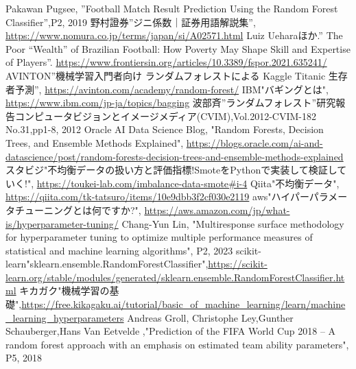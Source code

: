 \documentclass[platex]{suribt}
\begin{document}
\begin{thebibliography}{2}
\bibitem{}
Pakawan Pugsee, ”Football Match Result Prediction Using the Random Forest Classifier”,P2, 2019
\bibitem{}
野村證券”ジニ係数｜証券用語解説集”, \url{https://www.nomura.co.jp/terms/japan/si/A02571.html}
\bibitem{}
Luiz Ueharaほか.” The Poor “Wealth” of Brazilian Football: How Poverty May Shape Skill and Expertise of Players”. \url{https://www.frontiersin.org/articles/10.3389/fspor.2021.635241/}
\bibitem{}
AVINTON”機械学習入門者向け ランダムフォレストによる Kaggle Titanic 生存者予測”, \url{https://avinton.com/academy/random-forest/}
\bibitem{}
IBM"バギングとは", \url{https://www.ibm.com/jp-ja/topics/bagging}
\bibitem{}
波部斉”ランダムフォレスト”研究報告コンピュータビジョンとイメージメディア(CVIM),Vol.2012-CVIM-182 No.31,pp1-8, 2012
\bibitem{}
Oracle AI Data Science Blog, "Random Forests, Decision Trees, and Ensemble Methods Explained",  \url{https://blogs.oracle.com/ai-and-datascience/post/random-forests-decision-trees-and-ensemble-methods-explained}
\bibitem{}
スタビジ"不均衡データの扱い方と評価指標!SmoteをPythonで実装して検証していく!", \url{https://toukei-lab.com/imbalance-data-smote#i-4}
\bibitem{}
Qiita"不均衡データ", \url{https://qiita.com/tk-tatsuro/items/10e9dbb3f2cf030e2119}
\bibitem{}
aws"ハイパーパラメータチューニングとは何ですか?", \url{https://aws.amazon.com/jp/what-is/hyperparameter-tuning/}
\bibitem{}
Chang-Yun Lin, "Multiresponse surface methodology for hyperparameter tuning to optimize multiple performance measures of statistical and machine learning algorithms", P2, 2023
\bibitem{}
scikit-learn"sklearn.ensemble.RandomForestClassifier",\url{https://scikit-learn.org/stable/modules/generated/sklearn.ensemble.RandomForestClassifier.html}
\bibitem{}
キカガク"機械学習の基礎",\url{https://free.kikagaku.ai/tutorial/basic_of_machine_learning/learn/machine_learning_hyperparameters}
\bibitem{}
Andreas Groll, Christophe Ley,Gunther Schauberger,Hans Van Eetvelde ,"Prediction of the FIFA World Cup 2018 – A random forest approach with an emphasis on estimated team ability parameters", P5, 2018


\end{thebibliography}
\appendix%
\chapter{}
\end{document}

